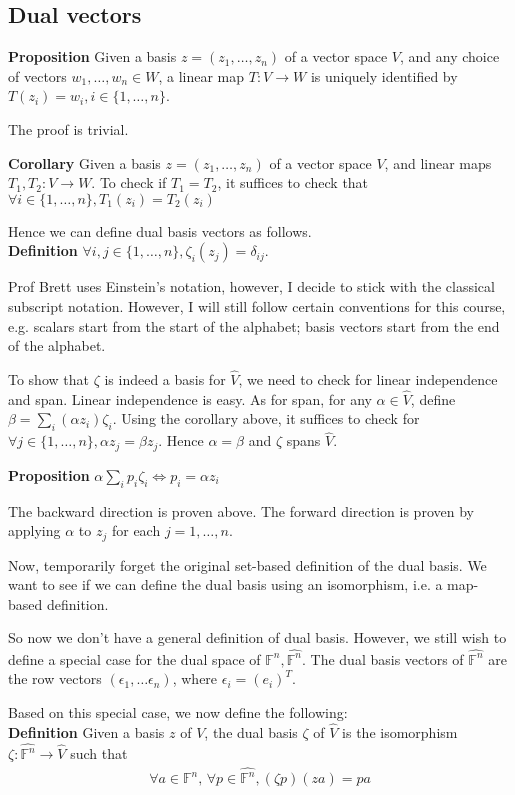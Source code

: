 \documentclass{article}
\begin{document}
\subsection{Dual vectors}
\textbf{Proposition} Given a basis $z=(z_1,\dots,z_n)$ of a vector space $V$, and any choice of vectors $w_1,\dots, w_n\in W$, a linear map $T:V\rightarrow W$ is uniquely identified by $T(z_i)=w_i, i\in \{1,\dots,n\}$.

The proof is trivial.

\textbf{Corollary} Given a basis $z=(z_1,\dots,z_n)$ of a vector space $V$, and linear maps $T_1,T_2:V\rightarrow W$. To check if $T_1=T_2$, it suffices to check that $\forall i\in \{1,\dots,n\}, T_1(z_i)=T_2(z_i)$

Hence we can define dual basis vectors as follows.\\
\textbf{Definition} $\forall i,j\in \{1,\dots, n\}, \zeta_i(z_j)=\delta_{ij}$.

Prof Brett uses Einstein's notation, however, I decide to stick with the classical subscript notation. However, I will still follow certain conventions for this course, e.g. scalars start from the start of the alphabet; basis vectors start from the end of the alphabet.

To show that $\zeta$ is indeed a basis for $\hat{V}$, we need to check for linear independence and span. Linear independence is easy. As for span, for any $\alpha \in \hat{V}$, define $\beta=\sum_i(\alpha z_i)\zeta_i$. Using the corollary above, it suffices to check for $\forall j\in \{1,\dots,n\}, \alpha z_j=\beta z_j$. Hence $\alpha=\beta$ and $\zeta$ spans $\hat{V}$.

\textbf{Proposition} $\alpha\sum_ip_i\zeta_i\iff p_i=\alpha z_i$

The backward direction is proven above. The forward direction is proven by applying $\alpha$ to $z_j$ for each $j=1,\dots,n$.

Now, temporarily forget the original set-based definition of the dual basis. We want to see if we can define the dual basis using an isomorphism, i.e. a map-based definition.

So now we don't have a general definition of dual basis. However, we still wish to define a special case for the dual space of $\mathbb{F}^n, \hat{\mathbb{F}^n}$. The dual basis vectors of $\hat{\mathbb{F}^n}$ are the row vectors $(\epsilon_1,\dots \epsilon_n)$, where $\epsilon_i=(e_i)^T$.

Based on this special case, we now define the following:\\
\textbf{Definition} Given a basis $z$ of $V$, the dual basis $\zeta$ of $\hat{V}$ is the isomorphism $\zeta: \hat{\mathbb{F}^n}\rightarrow \hat{V}$ such that 
\begin{align*}
	\forall a\in \mathbb{F}^n,\, \forall p\in \hat{\mathbb{F}^n}, (\zeta p)(za)=pa
\end{align*}
 
\end{document}

